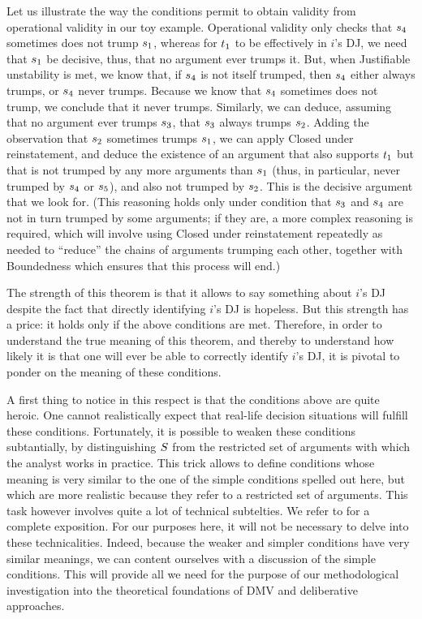 \documentclass[version=3.21, pagesize, twoside=off, bibliography=totoc, DIV=calc, fontsize=12pt, a4paper, french, english]{scrartcl}
\begin{document}
\begin{example}[cont.]
	Let us illustrate the way the conditions permit to obtain validity from operational validity in our toy example. Operational validity only checks that $s_4$ sometimes does not trump $s_1$, whereas for $t_1$ to be effectively in $i$’s \ac{DJ}, we need that $s_1$ be decisive, thus, that no argument ever trumps it. But, when Justifiable unstability is met, we know that, if $s_4$ is not itself trumped, then $s_4$ either always trumps, or $s_4$ never trumps. Because we know that $s_4$ sometimes does not trump, we conclude that it never trumps. Similarly, we can deduce, assuming that no argument ever trumps $s_3$, that $s_3$ always trumps $s_2$. Adding the observation that $s_2$ sometimes trumps $s_1$, we can apply Closed under reinstatement, and deduce the existence of an argument that also supports $t_1$ but that is not trumped by any more arguments than $s_1$ (thus, in particular, never trumped by $s_4$ or $s_5$), and also not trumped by $s_2$. This is the decisive argument that we look for. (This reasoning holds only under condition that $s_3$ and $s_4$ are not in turn trumped by some arguments; if they are, a more complex reasoning is required, which will involve using Closed under reinstatement repeatedly as needed to “reduce” the chains of arguments trumping each other, together with Boundedness which ensures that this process will end.)
\end{example}
	
The strength of this theorem is that it allows to say something about $i$'s \ac{DJ} despite the fact that directly identifying $i$'s \ac{DJ} is hopeless. 
But this strength has a price: it holds only if the above conditions are met. 
Therefore, in order to understand the true meaning of this theorem, and thereby to understand how likely it is that one will ever be able to correctly identify $i$'s \ac{DJ}, it is pivotal to ponder on the meaning of these conditions.

A first thing to notice in this respect is that the conditions above are quite heroic. 
One cannot realistically expect that real-life decision situations will fulfill these conditions. 
Fortunately, it is possible to weaken these conditions subtantially, by distinguishing $S$ from the restricted set of arguments with which the analyst works in practice. 
This trick allows to define conditions whose meaning is very similar to the one of the simple conditions spelled out here, but which are more realistic because they refer to a restricted set of arguments. 
This task however involves quite a lot of technical subtelties. We refer to \citet{cailloux_formal_2018} for a complete exposition. For our purposes here, it will not be necessary to delve into these technicalities. 
Indeed, because the weaker and simpler conditions have very similar meanings, we can content ourselves with a discussion of the simple conditions. 
This will provide all we need for the purpose of our methodological investigation into the theoretical foundations of DMV and deliberative approaches.
\end{document}
